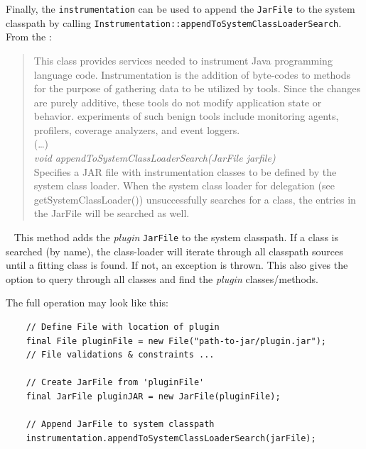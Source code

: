 Finally, the \lstinline{instrumentation} can be used to append the \lstinline{JarFile} to the system classpath by calling \lstinline{Instrumentation::appendToSystemClassLoaderSearch}.
From the \textcite{javadoc:instrumentation}:
\begin{quote}
    This class provides services needed to instrument Java programming language code. Instrumentation is the addition of byte-codes to methods for the purpose of gathering data to be utilized by tools. Since the changes are purely additive, these tools do not modify application state or behavior. experiments of such benign tools include monitoring agents, profilers, coverage analyzers, and event loggers.
    \\
    (\dots)
    \\
    \textit{void appendToSystemClassLoaderSearch(JarFile jarfile)}\\
    Specifies a JAR file with instrumentation classes to be defined by the system class loader. When the system class loader for delegation (see getSystemClassLoader()) unsuccessfully searches for a class, the entries in the JarFile will be searched as well.
\end{quote}~\parencite{javadoc:instrumentation}
This method adds the \textit{plugin} \lstinline{JarFile} to the system classpath.
If a class is searched (by name), the class-loader will iterate through all classpath sources until a fitting class is found.
If not, an exception is thrown.
This also gives the option to query through all classes and find the \textit{plugin} classes/methods.

The full operation may look like this:
\begin{lstlisting}
    // Define File with location of plugin
    final File pluginFile = new File("path-to-jar/plugin.jar");
    // File validations & constraints ...

    // Create JarFile from 'pluginFile'
    final JarFile pluginJAR = new JarFile(pluginFile);

    // Append JarFile to system classpath
    instrumentation.appendToSystemClassLoaderSearch(jarFile);
\end{lstlisting}